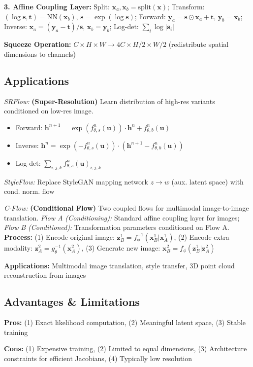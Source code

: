 \textbf{3. Affine Coupling Layer:} Split: $\mathbf{x}_a, \mathbf{x}_b = \text{split}(\mathbf{x})$; Transform: $(\log \mathbf{s}, \mathbf{t}) = \text{NN}(\mathbf{x}_b)$, $\mathbf{s} = \exp(\log \mathbf{s})$; Forward: $\mathbf{y}_a = \mathbf{s} \odot \mathbf{x}_a + \mathbf{t}$, $\mathbf{y}_b = \mathbf{x}_b$; Inverse: $\mathbf{x}_a = (\mathbf{y}_a - \mathbf{t}) / \mathbf{s}$, $\mathbf{x}_b = \mathbf{y}_b$; Log-det: $\sum_i \log |\mathbf{s}_i|$

\textbf{Squeeze Operation:} $C \times H \times W \to 4C \times H/2 \times W/2$ (redistribute spatial dimensions to channels)

\subsection{Applications}

\emph{SRFlow:} \textbf{(Super-Resolution)} Learn distribution of high-res variants conditioned on low-res image.
\begin{itemize}
    \item Forward: $\mathbf{h}^{n+1} = \exp(f_{\theta,s}^n(\mathbf{u})) \cdot \mathbf{h}^n + f_{\theta,b}^n(\mathbf{u})$
    \item Inverse: $\mathbf{h}^n = \exp(-f_{\theta,s}^n(\mathbf{u})) \cdot (\mathbf{h}^{n+1} - f_{\theta,b}^n(\mathbf{u}))$
    \item Log-det: $\sum_{i,j,k} f_{\theta,s}^n(\mathbf{u})_{i,j,k}$
\end{itemize}

\emph{StyleFlow:} Replace StyleGAN mapping network $z \to w$ (aux. latent space) with cond. norm. flow

\emph{C-Flow:} \textbf{(Conditional Flow)} Two coupled flows for multimodal image-to-image translation. \textit{Flow A (Conditioning):} Standard affine coupling layer for images; \textit{Flow B (Conditioned):} Transformation parameters conditioned on Flow A.
\textbf{Process:} (1) Encode original image: $\mathbf{z}_B^1 = f_\phi^{-1}(\mathbf{x}_B^1 | \mathbf{x}_A^1)$, (2) Encode extra modality: $\mathbf{z}_A^2 = g_\theta^{-1}(\mathbf{x}_A^2)$, (3) Generate new image: $\mathbf{x}_B^2 = f_\phi(\mathbf{z}_B^1 | \mathbf{z}_A^2)$

\textbf{Applications:} Multimodal image translation, style transfer, 3D point cloud reconstruction from images

\subsection{Advantages \& Limitations}

\textbf{Pros:} (1) Exact likelihood computation, (2) Meaningful latent space, (3) Stable training

\textbf{Cons:} (1) Expensive training, (2) Limited to equal dimensions, (3) Architecture constraints for efficient Jacobians, (4) Typically low resolution
